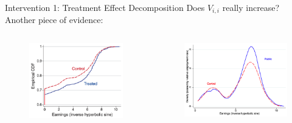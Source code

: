 \begin{frame}{Intervention 1: Treatment Effect Decomposition}
    Does $V_{i,i}$ really increase? Another piece of evidence:
    \vspace*{-10pt}
    \begin{columns}[T]
        \begin{column}{0.45\textwidth}
            \begin{figure}
                \centering
                \includegraphics[height = 0.6 \textheight]{images/dist_earnings.png}
            \end{figure}
        \end{column}

        \begin{column}{0.45\textwidth}
            \begin{figure}
                \centering
                \includegraphics[height = 0.6 \textheight]{images/dist_earnings_empadj.png}
            \end{figure}
        \end{column}
    \end{columns}
\end{frame}

